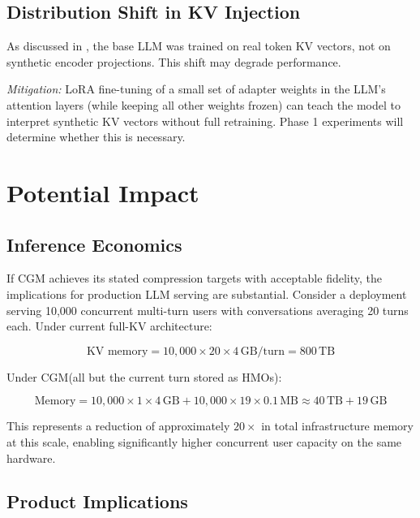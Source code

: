 \documentclass[11pt, a4paper, twoside]{article}
\theoremstyle{definition}
\newcommand{\CGM}{\textsc{CGM}\xspace}
\begin{document}
\subsection{Distribution Shift in KV Injection}

As discussed in , the base LLM was trained on real token KV
vectors, not on synthetic encoder projections. This shift may degrade performance.

\textit{Mitigation:} LoRA fine-tuning of a small set of adapter weights in the
LLM's attention layers (while keeping all other weights frozen) can teach the model
to interpret synthetic KV vectors without full retraining. Phase 1 experiments will
determine whether this is necessary.

\section{Potential Impact}
\label{sec:impact}

\subsection{Inference Economics}

If \CGM achieves its stated compression targets with acceptable fidelity, the
implications for production LLM serving are substantial. Consider a deployment
serving 10,000 concurrent multi-turn users with conversations averaging 20 turns
each. Under current full-KV architecture:

\[
\text{KV memory} = 10{,}000 \times 20 \times 4\,\text{GB/turn} = 800\,\text{TB}
\]

Under \CGM (all but the current turn stored as HMOs):

\[
\text{Memory} = 10{,}000 \times 1 \times 4\,\text{GB} + 10{,}000 \times 19 \times 0.1\,\text{MB}
            \approx 40\,\text{TB} + 19\,\text{GB}
\]

This represents a reduction of approximately $20\times$ in total infrastructure
memory at this scale, enabling significantly higher concurrent user capacity on
the same hardware.

\subsection{Product Implications}
\end{document}
